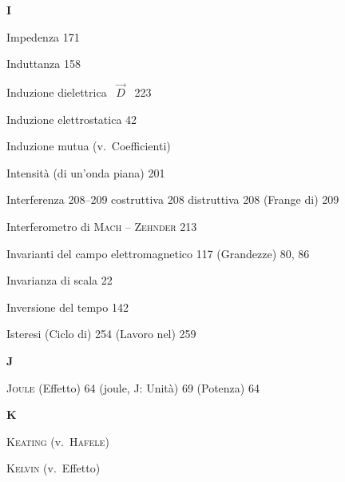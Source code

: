 \begin{theindex}
  \indexspace
  \item \textbf{I}
  \indexspace
  \item Impedenza 171
  \item Induttanza 158
  \item Induzione dielettrica \ $\vec D$ \ 223
  \item Induzione elettrostatica 42
  \item Induzione mutua (v.\ Coefficienti)
  \item Intensit\`a (di un'onda piana) 201
  \item Interferenza 208--209
    \subitem costruttiva 208
    \subitem distruttiva 208
    \subitem (Frange di) 209
  \item Interferometro di \textsc{Mach} -- \textsc{Zehnder} 213
  \item Invarianti
    \subitem del campo elettromagnetico 117
    \subitem (Grandezze) 80, 86
  \item Invarianza di scala 22
  \item Inversione del tempo 142
  \item Isteresi (Ciclo di) 254
    \subitem (Lavoro nel) 259

  \indexspace
  \item \textbf{J}
  \indexspace
  \item \textsc{Joule} (Effetto) 64
    \subitem (joule, J: Unit\`a) 69
    \subitem (Potenza) 64

  \indexspace
  \item \textbf{K}
  \indexspace
  \item \textsc{Keating} (v.\ \textsc{Hafele})
  \item \textsc{Kelvin} (v.\ Effetto)


\end{theindex}
